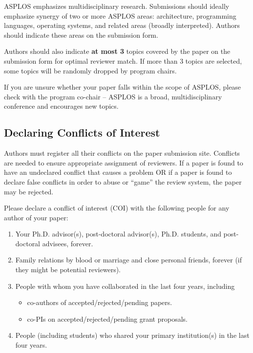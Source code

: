 \documentclass[pageno]{jpaper}
\begin{document}
ASPLOS emphasizes multidisciplinary research. Submissions should ideally
emphasize synergy of two or more ASPLOS areas: architecture, programming
languages, operating systems, and related areas (broadly
interpreted). Authors should indicate these areas on the submission form.

Authors should also indicate \textbf{at most 3}
topics covered by the paper on the submission form 
for optimal reviewer match. If more than 3 topics are selected, some topics
will be randomly dropped by program chairs.

If
you are unsure whether your paper falls within the scope of ASPLOS, please
check with the program co-chair -- ASPLOS is a broad, multidisciplinary
conference and encourages new topics.

\subsection{Declaring Conflicts of Interest}

Authors must register all their conflicts on the paper submission site.
Conflicts are needed to ensure appropriate assignment of reviewers.
If a paper is found to have an undeclared conflict that causes
a problem OR if a paper is found to declare false conflicts in order to
abuse or ``game'' the review system, the paper may be rejected.

Please declare a conflict of interest (COI) with the following people
for any author of your paper:

\begin{enumerate}
\item Your Ph.D. advisor(s), post-doctoral advisor(s), Ph.D. students,
      and post-doctoral advisees, forever.
\item Family relations by blood or marriage and close personal friends, forever (if they might be potential reviewers).
\item People with whom you have collaborated in the last four years, including
\begin{itemize}
\item co-authors of accepted/rejected/pending papers.
\item co-PIs on accepted/rejected/pending grant proposals.
\end{itemize}
\item People (including students) who shared your primary institution(s) in the
last four years.
\end{enumerate}
\end{document}
